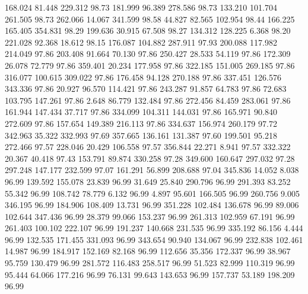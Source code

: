  168.024   81.448  229.312        98.73
 181.999   96.389  278.586        98.73
 133.210  101.704  261.505        98.73
 262.066   14.067  341.599        98.58
  44.827   82.565  102.954        98.44
 166.225  165.405  354.831        98.29
 199.636   30.915   67.508        98.27
 134.312  128.225    6.368        98.20
 221.028   92.368   18.612        98.15
 176.087  104.882  287.911        97.93
 200.088  117.982  214.049        97.86
 203.408   91.664   70.130        97.86
 250.427   28.533   54.119        97.86
 172.309   26.078   72.779        97.86
 359.401   20.234  177.958        97.86
 322.185  151.005  269.185        97.86
 316.077  100.615  309.022        97.86
 176.458   94.128  270.188        97.86
 337.451  126.576  343.336        97.86
  20.927   96.570  114.421        97.86
 243.287   91.857   64.783        97.86
  72.683  103.795  147.261        97.86
   2.648   86.779  132.484        97.86
 272.456   84.459  283.061        97.86
 161.944  147.434   37.717        97.86
 334.099  104.311  144.031        97.86
 165.971   90.840  272.609        97.86
 157.654  149.389  216.113        97.86
 334.637  156.974  260.179        97.72
 342.963   35.322  332.993        97.69
 357.665  136.161  131.387        97.60
 199.501   95.218  272.466        97.57
 228.046   20.429  106.558        97.57
 356.844   22.271    8.941        97.57
 332.322   20.367   40.418        97.43
 153.791   89.874  330.258        97.28
 349.600  160.647  297.032        97.28
 297.248  147.177  232.599        97.07
 161.291   56.899  208.688        97.04
 345.836   14.052    8.038        96.99
 139.592  155.078   23.839        96.99
  31.649   25.840  290.796        96.99
 291.393   83.252   55.342        96.99
 108.742   78.779    6.132        96.99
   4.897   95.601  166.505        96.99
 260.756    9.005  346.195        96.99
 184.906  108.409   13.731        96.99
 351.228  102.484  136.678        96.99
  89.006  102.644  347.436        96.99
  28.379   99.066  153.237        96.99
 261.313  102.959   67.191        96.99
 261.403  100.102  222.107        96.99
 191.237  140.668  231.535        96.99
 335.192   86.156    4.444        96.99
 132.535  171.455  331.093        96.99
 343.654   90.940  134.067        96.99
 232.838  102.461   14.987        96.99
 184.917  152.169   82.168        96.99
 112.656   35.356  172.337        96.99
  38.967   95.759  130.479        96.99
 281.572  116.483  258.517        96.99
  51.523   82.999  110.319        96.99
  95.444   64.066  177.216        96.99
  76.131   99.643  143.653        96.99
 157.737   53.189  198.209        96.99
